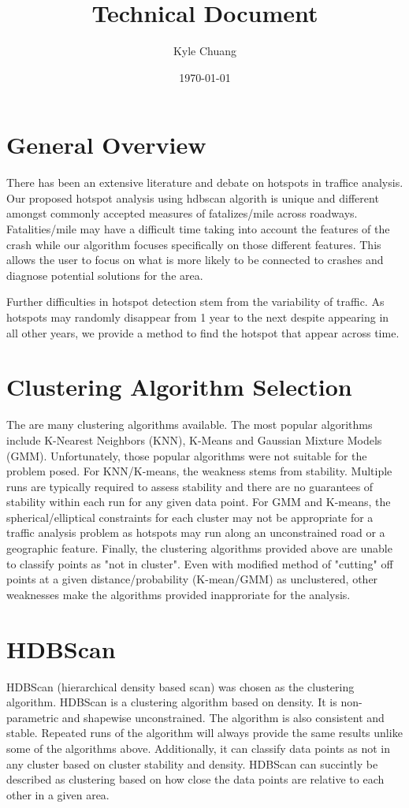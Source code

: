 \documentclass{article}
\begin{document}
\title{Technical Document}
\date{\today}
\author{Kyle Chuang}

\section{General Overview}
There has been an extensive literature and debate on hotspots in traffice analysis. Our proposed hotspot analysis using hdbscan algorith is unique and different amongst commonly accepted measures of fatalizes/mile across roadways. Fatalities/mile may have a difficult time taking into account the features of the crash while our algorithm focuses specifically on those different features. This allows the user to focus on what is more likely to be connected to crashes and diagnose potential solutions for the area.

Further difficulties in hotspot detection stem from the variability of traffic. As hotspots may randomly disappear from 1 year to the next despite appearing in all other years, we provide a method to find the hotspot that appear across time.

\section{Clustering Algorithm Selection}
The are many clustering algorithms available. The most popular algorithms include K-Nearest Neighbors (KNN), K-Means and Gaussian Mixture Models (GMM). Unfortunately, those popular algorithms were not suitable for the problem posed. For KNN/K-means, the weakness stems from stability. Multiple runs are typically required to assess stability and there are no guarantees of stability within each run for any given data point. For GMM and K-means, the spherical/elliptical constraints for each cluster may not be appropriate for a traffic analysis problem as hotspots may run along an unconstrained road or a geographic feature. Finally, the clustering algorithms provided above are unable to classify points as "not in cluster". Even with modified method of "cutting" off points at a given distance/probability (K-mean/GMM) as unclustered, other weaknesses make the algorithms provided inapproriate for the analysis.

\section{HDBScan}
HDBScan (hierarchical density based scan) was chosen as the clustering algorithm. HDBScan is a clustering algorithm based on density. It is non-parametric and shapewise unconstrained. The algorithm is also consistent and stable. Repeated runs of the algorithm will always provide the same results unlike some of the algorithms above. Additionally, it can classify data points as not in any cluster based on cluster stability and density.  HDBScan can succintly be described as clustering based on how close the data points are relative to each other in a given area.
\end{document}
